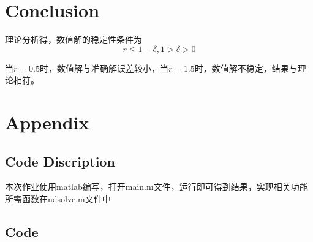 \documentclass{article}
\begin{document}
\section{Conclusion}

理论分析得，数值解的稳定性条件为$$r\leq 1-\delta ,1>\delta > 0$$

当$r =0.5$时，数值解与准确解误差较小，当$r =1.5$时，数值解不稳定，结果与理论相符。

\section{Appendix}
\subsection{Code Discription}
本次作业使用matlab编写，打开main.m文件，运行即可得到结果，实现相关功能所需函数在ndsolve.m文件中
\subsection{Code}


\end{document}
